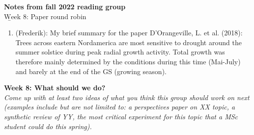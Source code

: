\documentclass[11pt,letter]{article}
\begin{document}

\renewcommand{\refname}{\CHead{}}

{\bf \large Notes from fall 2022 reading group}\\

{\b Week 8: Paper round robin}\\


\begin{enumerate}
\item (Frederik): My brief summary for the paper D'Orangeville, L. et al. (2018):
Trees across eastern Nordamerica are most sensitive to drought around the summer solstice during peak radial growth activity. Total growth was therefore mainly determined by the conditions during this time (Mai-July) and barely at the end of the GS (growing season).
\end{enumerate}



{\bf Week 8: What should we do?}\\

\emph{Come up with at least two ideas of what you think this group should work on next (examples include but are not limited to: a perspectives paper on XX topic, a synthetic review of YY, the most critical experiment for this topic that a MSc student could do this spring).}
\end{document}
